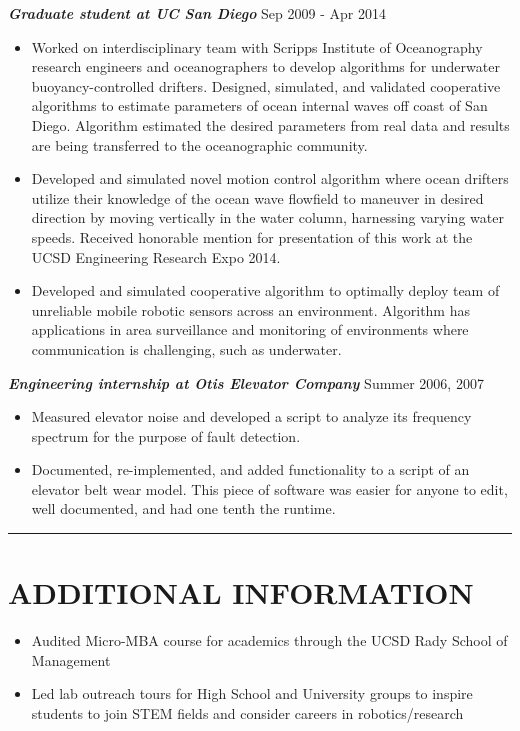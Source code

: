 \documentclass{res}
\begin{document}
\begin{resume}
\vspace*{-1ex}
{\sl  \bf Graduate student at UC San Diego} \hfill Sep 2009 - Apr 2014 
\begin{itemize}
\item Worked on interdisciplinary team with Scripps Institute of Oceanography research engineers and oceanographers to develop algorithms for underwater buoyancy-controlled drifters. Designed, simulated, and validated cooperative algorithms to estimate parameters of ocean internal waves off coast of San Diego.  Algorithm estimated the desired parameters from real data and results are being transferred to the oceanographic community.
\item Developed and simulated novel motion control algorithm where ocean drifters utilize their knowledge of the ocean wave flowfield to maneuver in desired direction by moving vertically in the water column, harnessing varying water speeds. Received honorable mention for presentation of this work at the UCSD Engineering Research Expo 2014.
\item Developed and simulated cooperative algorithm to optimally deploy team of unreliable mobile robotic sensors across an environment. Algorithm has applications in area surveillance and monitoring of environments where communication is challenging, such as underwater. 
\end{itemize}
\vspace*{-2ex}
 {\sl \bf Engineering internship at Otis Elevator Company} \hfill Summer 2006, 2007 
\begin{itemize}
\item Measured elevator noise and developed a script to analyze its frequency spectrum for the purpose of fault detection. 
\item Documented, re-implemented, and added functionality to a script of an elevator belt wear model.  This piece of software was easier for anyone to edit, well documented, and had one tenth the runtime.
\end{itemize}
%
 \vspace*{-3ex}
\hspace{-8.5ex}\rule{16.5cm}{0.4pt}
 \vspace*{-3ex}
\section{ADDITIONAL INFORMATION}
\begin{itemize}
\item Audited Micro-MBA course for academics through the UCSD Rady School of Management
\item Led lab outreach tours for High School and University groups to inspire students to join STEM fields and consider careers in robotics/research
\end{itemize}



\end{resume}
\end{document}
